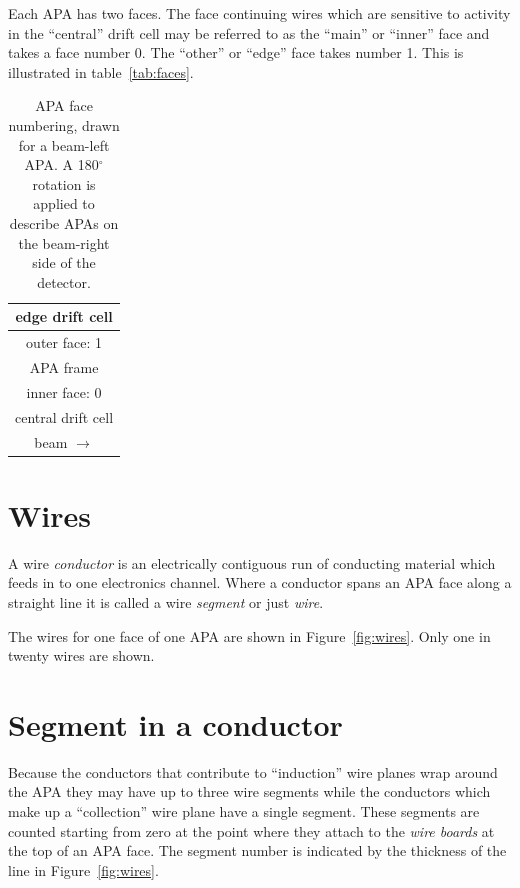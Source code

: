 \documentclass[pdftex,12pt,letter]{article}
\begin{document}
Each APA has two faces.  The face continuing wires which are sensitive
to activity in the ``central'' drift cell may be referred to as the
``main'' or ``inner'' face and takes a face number 0.  The ``other''
or ``edge'' face takes number 1.  This is illustrated in
table~\ref{tab:faces}.


\begin{table}[htp]
  \label{tab:apa}
  \centering
  \begin{tabular}[h]{|c|}
    \hline
    edge drift cell\\
    \hline
    \hline
    outer face: 1\\
    \hline
    APA frame\\
    \hline
    inner face: 0 \\
    \hline
    \hline
    central drift cell \\
    \hline
    \multicolumn{1}{c}{beam $\longrightarrow$} \\

  \end{tabular}
  \caption{APA face numbering, drawn for a beam-left APA.  A
    180$^\circ$ rotation is applied to describe APAs on the beam-right
    side of the detector.}
\end{table}


\section{Wires}

A wire \textit{conductor} is an electrically contiguous run of
conducting material which feeds in to one electronics channel.  Where
a conductor spans an APA face along a straight line it is called a
wire \textit{segment} or just \textit{wire}.

The wires for one face of one APA are shown in Figure~\ref{fig:wires}.
Only one in twenty wires are shown.

\section{Segment in a conductor}

Because the conductors that contribute to ``induction'' wire planes
wrap around the APA they may have up to three wire segments while the
conductors which make up a ``collection'' wire plane have a single
segment.  These segments are counted starting from zero at the point
where they attach to the \textit{wire boards} at the top of an APA
face.  The segment number is indicated by the thickness of the line in
Figure~\ref{fig:wires}.  
\end{document}
